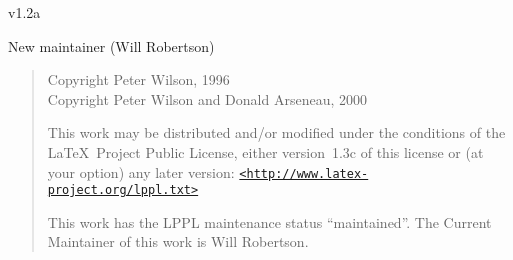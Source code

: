 \documentclass[DIV=8, parskip=half, pagesize=auto]{scrartcl}
\newcommand*{\angleurl}[1]{\href{#1}{\texttt{<#1>}}}
\begin{document}

\begin{labeling}[\hspace{\labelsep}--]{v1.2a}
\item[v1.2a] New maintainer (Will Robertson)
\end{labeling}

\bigskip

\begin{quote}
  \footnotesize
  Copyright Peter Wilson, 1996 \\
  Copyright Peter Wilson and Donald Arseneau, 2000
  
  This work may be distributed and/or modified under the
  conditions of the \LaTeX\ Project Public License, either
  version~1.3c of this license or (at your option) any 
  later version: \angleurl{http://www.latex-project.org/lppl.txt}
  
  This work has the LPPL maintenance status ``maintained''.
  The Current Maintainer of this work is Will Robertson.
\end{quote}
\end{document}
